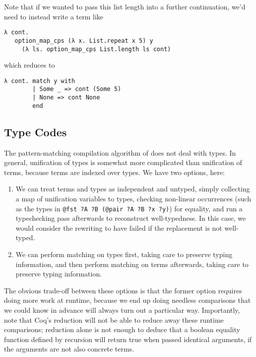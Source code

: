 Note that if we wanted to pass this list length into a further continuation, we'd need to instead write a term like
\begin{verbatim}
λ cont.
   option_map_cps (λ x. List.repeat x 5) y
     (λ ls. option_map_cps List.length ls cont)
\end{verbatim}
\noindent
which reduces to
\begin{verbatim}
λ cont. match y with
        | Some _ => cont (Some 5)
        | None => cont None
        end
\end{verbatim}

\subsection{Type Codes}\label{sec:rewriting-more:pre-reduction:type-codes}
The pattern-matching compilation algorithm of \textcite{Aehlig} does not deal with types.
In general, unification of types is somewhat more complicated than unification of terms, because terms are indexed over types.
We have two options, here:
\begin{enumerate}
\item
  We can treat terms and types as independent and untyped, simply collecting a map of unification variables to types, checking non-linear occurrences (such as the types in \texttt{@fst ?A ?B (@pair ?A ?B ?x ?y)}) for equality, and run a typechecking pass afterwards to reconstruct well-typedness.
  In this case, we would consider the rewriting to have failed if the replacement is not well-typed.
\item
  We can perform matching on types first, taking care to preserve typing information, and then perform matching on terms afterwards, taking care to preserve typing information.
\end{enumerate}

The obvious trade-off between these options is that the former option requires doing more work at runtime, because we end up doing needless comparisons that we could know in advance will always turn out a particular way.
Importantly, note that Coq's reduction will not be able to reduce away these runtime comparisons; reduction alone is not enough to deduce that a boolean equality function defined by recursion will return true when passed identical arguments, if the arguments are not also concrete terms.
%
%

